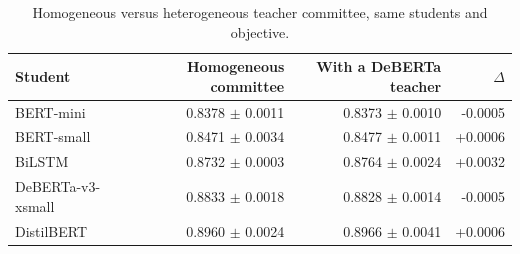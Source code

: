 \begin{table}[t]
\centering
\caption{Homogeneous versus heterogeneous teacher committee, same students and objective.}
\label{tab:committee}
\begin{tabular}{lrrr}
\toprule
Student & Homogeneous committee & With a DeBERTa teacher & $\Delta$ \\
\midrule
BERT-mini & 0.8378 $\pm$ 0.0011 & 0.8373 $\pm$ 0.0010 & -0.0005 \\
BERT-small & 0.8471 $\pm$ 0.0034 & 0.8477 $\pm$ 0.0011 & +0.0006 \\
BiLSTM & 0.8732 $\pm$ 0.0003 & 0.8764 $\pm$ 0.0024 & +0.0032 \\
DeBERTa-v3-xsmall & 0.8833 $\pm$ 0.0018 & 0.8828 $\pm$ 0.0014 & -0.0005 \\
DistilBERT & 0.8960 $\pm$ 0.0024 & 0.8966 $\pm$ 0.0041 & +0.0006 \\
\bottomrule
\end{tabular}
\end{table}